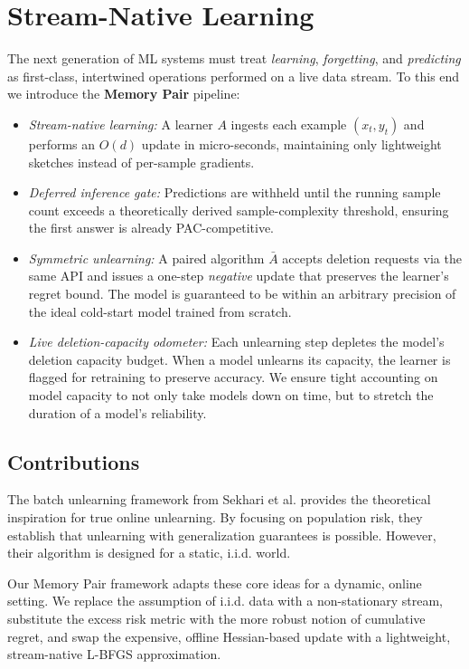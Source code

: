 \documentclass[a4paper,12pt]{article}
\begin{document}
\section{Stream-Native Learning}

The next generation of ML systems must treat \textit{learning}, \textit{forgetting}, and \textit{predicting} as first-class, intertwined operations performed on a live data stream.  To this end we introduce the \textbf{Memory Pair} pipeline:

\begin{itemize}
    \item \textit{Stream-native learning:} A learner $A$ ingests each example $(x_t,y_t)$ and performs an $O(d)$ update in micro-seconds, maintaining only lightweight sketches instead of per-sample gradients.
    \item \textit{Deferred inference gate:} Predictions are withheld until the running sample count exceeds a theoretically derived sample-complexity threshold, ensuring the first answer is already PAC-competitive.
    \item \textit{Symmetric unlearning:} A paired algorithm $\bar{A}$ accepts deletion requests via the same API and issues a one-step \textit{negative} update that preserves the learner’s regret bound. The model is guaranteed to be within an arbitrary precision of the ideal cold-start model trained from scratch.
    \item \textit{Live deletion-capacity odometer:} Each unlearning step depletes the model's deletion capacity budget. When a model unlearns its capacity, the learner is flagged for retraining to preserve accuracy. We ensure tight accounting on model capacity to not only take models down on time, but to stretch the duration of a model's reliability.
\end{itemize}

\subsection{Contributions}

The batch unlearning framework from Sekhari et al. provides the theoretical inspiration for true online unlearning. By focusing on population risk, they establish that unlearning with generalization guarantees is possible. However, their algorithm is designed for a static, i.i.d. world.

Our Memory Pair framework adapts these core ideas for a dynamic, online setting. We replace the assumption of i.i.d. data with a non-stationary stream, substitute the excess risk metric with the more robust notion of cumulative regret, and swap the expensive, offline Hessian-based update with a lightweight, stream-native L-BFGS approximation. 
\end{document}
